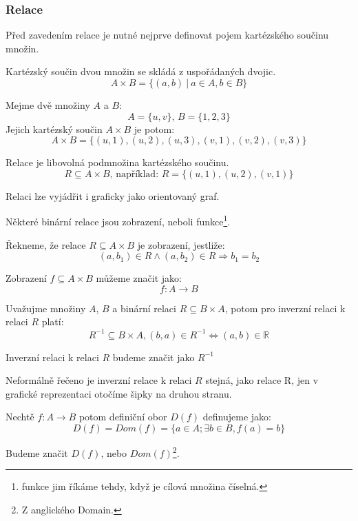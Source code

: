 \subsubsection*{Relace}
Před zavedením relace je nutné nejprve definovat pojem kartézského součinu množin.
\begin{definition} 
	Kartézský součin dvou množin se skládá z uspořádaných dvojic.
	$$A \times B = \{(a, b)\: | \: a \in A, b \in B\}$$
\end{definition}
\begin{example}
	Mejme dvě množiny $A$ a $B$:
    \[A = \{u, v\}
	\textrm{, }
	B = \{1, 2, 3\}\]
	Jejich kartézský součin $A\times B$ je potom:
	$$A \times B = \{(u, 1), (u, 2), (u, 3), (v, 1), (v, 2), (v, 3)\}$$
\end{example}

\begin{definition}[Relace]
    Relace je libovolná podmnožina kartézského součinu.
	$$R \subseteq A \times B \textrm{, například: } R = \{(u, 1), (u, 2), (v, 1)\}$$

	Relaci lze vyjádřit i graficky jako orientovaný graf.
\end{definition}


Některé binární relace jsou zobrazení, neboli funkce\footnote{funkce jim říkáme tehdy,
když je cílová množina číselná.}.

\begin{definition}[Zobrazení]
	Řekneme, že relace $R \subseteq A \times B$ je zobrazení, jestliže:
	$$(a, b_1) \in R \wedge (a, b_2) \in R \Rightarrow b_1 = b_2$$

	Zobrazení $f \subseteq A \times B$ můžeme značit jako:
	$$f: A \rightarrow B$$
\end{definition}


\begin{definition}
	Uvažujme množiny $A$, $B$ a binární relaci $R \subseteq B \times A$, potom pro
	inverzní relaci k relaci $R$ platí:
	$$R^{-1} \subseteq B \times A,  (b, a) \in R^{-1} \Leftrightarrow (a, b) \in \mathbb{R}$$

	Inverzní relaci k relaci $R$ budeme značit jako $R^{-1}$

	Neformálně řečeno je inverzní relace k relaci $R$ stejná, jako relace R,
	jen v grafické reprezentaci otočíme šipky na druhou stranu.
\end{definition}


\begin{definition}
	Nechtě $f: A \rightarrow B$ potom definiční obor $D(f)$ definujeme jako:
	$$D(f) = Dom(f) = \{a \in A; \exists b \in B, f(a) = b\}$$

	Budeme značit $D(f)$, nebo $Dom(f)$\footnote{Z anglického Domain.}.
\end{definition}

